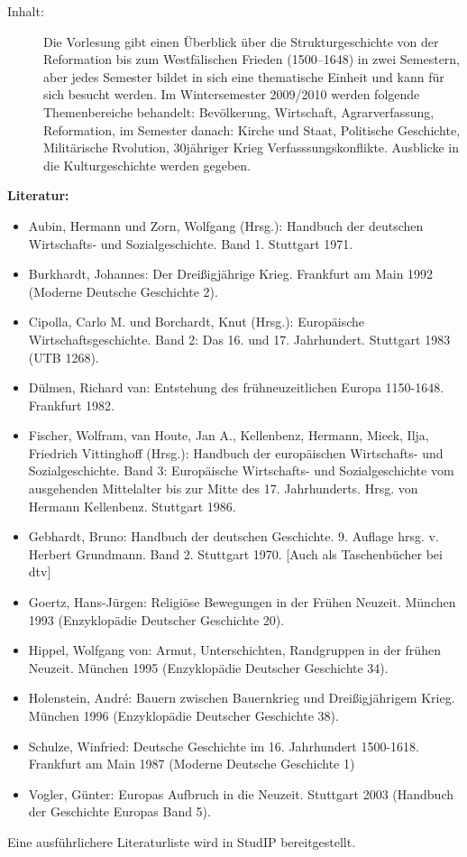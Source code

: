 \documentclass[%
a4paper, %
11pt,               %
leqno,              %
fleqn,              %
]
{scrartcl}
\begin{document}
\begin{description}
  \item[Inhalt:] Die Vorlesung gibt einen Überblick über die Strukturgeschichte
    von der Reformation bis zum Westfälischen Frieden (1500--1648) in zwei
    Semestern, aber jedes Semester bildet in sich eine thematische Einheit und
    kann für sich besucht werden. Im Wintersemester 2009/2010 werden folgende
    Themenbereiche behandelt: Bevölkerung, Wirtschaft, Agrarverfassung,
    Reformation, im Semester danach: Kirche und Staat, Politische Geschichte,
    Militärische Rvolution, 30jähriger Krieg Verfasssungskonflikte. Ausblicke in
    die Kulturgeschichte werden gegeben.
\end{description}
\textsf{\textbf{Literatur:}}
\begin{itemize}\itemsep0pt
  \item Aubin, Hermann und Zorn, Wolfgang (Hrsg.): Handbuch der deutschen
    Wirtschafts- und Sozialgeschichte. Band 1. Stuttgart 1971.
  \item Burkhardt, Johannes: Der Dreißigjährige Krieg. Frankfurt am Main 1992
    (Moderne Deutsche Geschichte 2).
  \item Cipolla, Carlo M. und Borchardt, Knut (Hrsg.): Europäische
    Wirtschaftsgeschichte. Band 2: Das 16. und 17. Jahrhundert. Stuttgart 1983
    (UTB 1268).
  \item Dülmen, Richard van: Entstehung des frühneuzeitlichen Europa
    1150-1648.  Frankfurt 1982.
  \item Fischer, Wolfram, van Houte, Jan A., Kellenbenz, Hermann, Mieck, Ilja,
    Friedrich Vittinghoff (Hrsg.): Handbuch der europäischen Wirtschafts- und
    Sozialgeschichte. Band 3: Europäische Wirtschafts- und Sozialgeschichte
    vom ausgehenden Mittelalter bis zur Mitte des 17. Jahrhunderts. Hrsg. von
    Hermann Kellenbenz. Stuttgart 1986.
  \item Gebhardt, Bruno: Handbuch der deutschen Geschichte. 9. Auflage hrsg.
    v. Herbert Grundmann. Band 2. Stuttgart 1970. [Auch als Taschenbücher bei
    dtv]
  \item Goertz, Hans-Jürgen: Religiöse Bewegungen in der Frühen Neuzeit.
    München 1993 (Enzyklopädie Deutscher Geschichte 20).
  \item Hippel, Wolfgang von: Armut, Unterschichten, Randgruppen in der frühen
    Neuzeit.  München 1995 (Enzyklopädie Deutscher Geschichte 34).
  \item Holenstein, André: Bauern zwischen Bauernkrieg und Dreißigjährigem
    Krieg.  München 1996 (Enzyklopädie Deutscher Geschichte 38).
  \item Schulze, Winfried: Deutsche Geschichte im 16. Jahrhundert 1500-1618.
    Frankfurt am Main 1987 (Moderne Deutsche Geschichte 1)
  \item Vogler, Günter: Europas Aufbruch in die Neuzeit. Stuttgart 2003
    (Handbuch der Geschichte Europas Band 5).
\end{itemize}
Eine ausführlichere Literaturliste wird in StudIP bereitgestellt.
\end{document}
